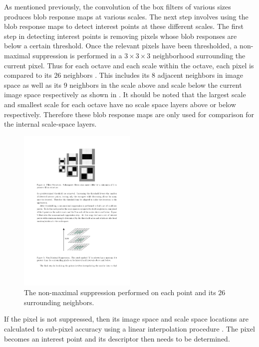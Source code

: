\documentclass{report}
\begin{document}
As mentioned previously, the convolution of the box filters of various sizes produces blob response maps at various scales. The next step involves using the blob response maps to detect interest points at these different scales. The first step in detecting interest points is removing pixels whose blob responses are below a certain threshold. Once the relevant pixels have been thresholded,  a non-maximal suppression is performed in a $3 \times 3 \times 3$ neighborhood surrounding the current pixel. Thus for each octave and each scale within the octave, each pixel is compared to its $26$ neighbors \cite{Evans2009}. This includes its $8$ adjacent neighbors in image space as well as its $9$ neighbors in the scale above and scale below the current image space respectively as shown in  \cite{Lowe2004}. It should be noted that the largest scale and smallest scale for each octave have no scale space layers above or below respectively. Therefore these blob response maps are only used for comparison for the internal scale-space layers. \\

\begin{figure}[h!] 
  \centering
    \includegraphics[width=0.5\textwidth]{../Drawings/methods/SURF2D_Nonmaximal_suppression.pdf}
    \caption{The non-maximal suppression performed on each point and its $26$ surrounding neighbors.}
    \label{fig:imageSpace}
\end{figure}

If the pixel is not suppressed, then its image space and scale space locations are calculated to sub-pixel accuracy using a linear interpolation procedure \cite{Evans2009}. The pixel becomes an interest point and its descriptor then needs to be determined.\\
\end{document}
